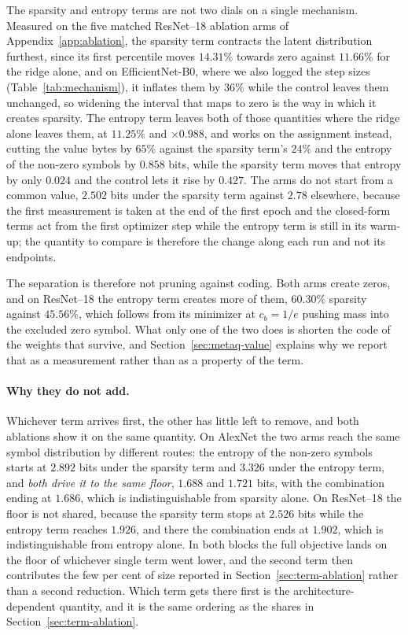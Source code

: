 \documentclass{article}
\begin{document}
The sparsity and entropy terms are not two dials on a single mechanism. Measured
on the five matched ResNet--18 ablation arms of Appendix~\ref{app:ablation}, the
sparsity term contracts the latent distribution furthest, since its first
percentile moves $14.31\%$ towards zero against $11.66\%$ for the ridge alone,
and on EfficientNet-B0, where we also logged the step sizes
(Table~\ref{tab:mechanism}), it inflates them by $36\%$ while the control leaves
them unchanged, so widening the interval that maps to zero is the way in which it
creates sparsity. The entropy term leaves
both of those quantities where the ridge alone leaves them, at $11.25\%$ and
$\times 0.988$, and works on the assignment instead, cutting the value bytes by
$65\%$ against the sparsity term's $24\%$ and the entropy of the non-zero symbols
by $0.858$ bits, while the sparsity term moves that entropy by only $0.024$ and
the control lets it rise by $0.427$. The arms do not start from a common value,
$2.502$ bits under the sparsity term against $2.78$ elsewhere, because the first
measurement is taken at the end of the first epoch and the closed-form terms act
from the first optimizer step while the entropy term is still in its warm-up; the
quantity to compare is therefore the change along each run and not its endpoints.

The separation is therefore not pruning against coding. Both arms create zeros,
and on ResNet--18 the entropy term creates more of them, $60.30\%$ sparsity
against $45.56\%$, which follows from its minimizer at $c_b=1/e$ pushing mass into
the excluded zero symbol. What only one of the two does is shorten the code of the
weights that survive, and Section~\ref{sec:metaq-value} explains why we report
that as a measurement rather than as a property of the term.

\paragraph{Why they do not add.} Whichever term arrives first, the other has
little left to remove, and both ablations show it on the same quantity. On
AlexNet the two arms reach the same symbol distribution by different routes: the
entropy of the non-zero symbols starts at $2.892$ bits under the sparsity term
and $3.326$ under the entropy term, and \emph{both drive it to the same floor},
$1.688$ and $1.721$ bits, with the combination ending at $1.686$, which is
indistinguishable from sparsity alone. On ResNet--18 the floor is not shared,
because the sparsity term stops at $2.526$ bits while the entropy term reaches
$1.926$, and there the combination ends at $1.902$, which is indistinguishable
from entropy alone.
In both blocks the full objective lands on the floor of whichever single term
went lower, and the second term then contributes the few per cent of size
reported in Section~\ref{sec:term-ablation} rather than a second reduction. Which term gets
there first is the architecture-dependent quantity, and it is the same ordering
as the shares in Section~\ref{sec:term-ablation}.
\end{document}
